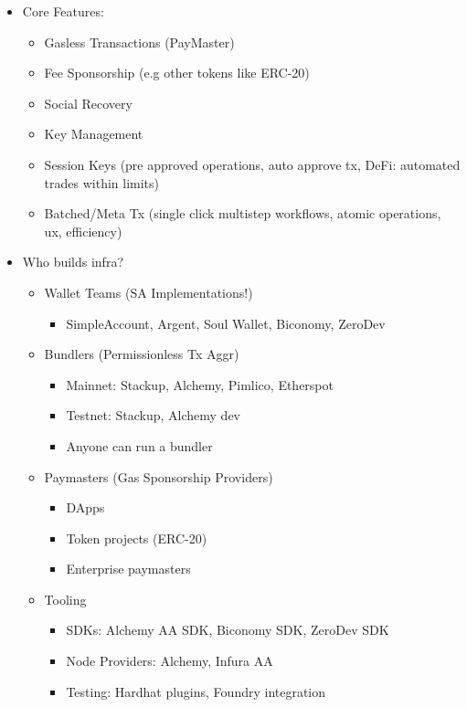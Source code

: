 \documentclass[../Main.tex]{subfiles}
\begin{document}
\begin{itemize}
    \item Core Features:
          \begin{itemize}
              \item Gasless Transactions (PayMaster)
              \item Fee Sponsorship (e.g other tokens like ERC-20)
              \item Social Recovery
              \item Key Management
              \item Session Keys (pre approved operations, auto approve tx, DeFi: automated trades within limits)
              \item Batched/Meta Tx (single click multistep workflows, atomic operations, ux, efficiency)
          \end{itemize}
\end{itemize}

\begin{itemize}
    \item Who builds infra?
          \begin{itemize}
              \item Wallet Teams (SA Implementations!)
                    \begin{itemize}
                        \item SimpleAccount, Argent, Soul Wallet, Biconomy, ZeroDev
                    \end{itemize}
              \item Bundlers (Permissionless Tx Aggr)
                    \begin{itemize}
                        \item Mainnet: Stackup, Alchemy, Pimlico, Etherspot
                        \item Testnet: Stackup, Alchemy dev
                        \item Anyone can run a bundler
                    \end{itemize}
              \item Paymasters (Gas Sponsorship Providers)
                    \begin{itemize}
                        \item DApps
                        \item Token projects (ERC-20)
                        \item Enterprise paymasters
                    \end{itemize}
              \item Tooling
                    \begin{itemize}
                        \item SDKs: Alchemy AA SDK, Biconomy SDK, ZeroDev SDK
                        \item Node Providers: Alchemy, Infura AA
                        \item Testing: Hardhat plugins, Foundry integration
                    \end{itemize}
          \end{itemize}
\end{itemize}
\end{document}
